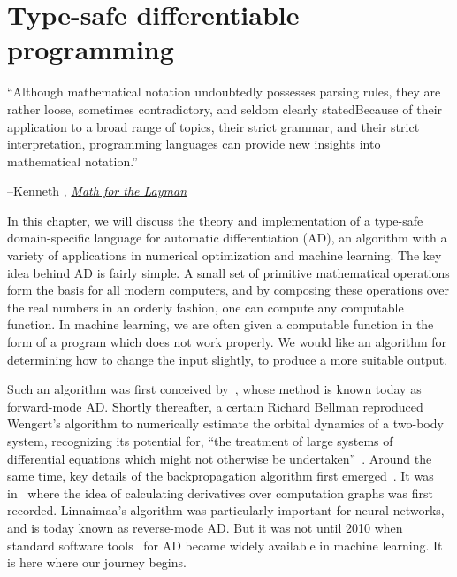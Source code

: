 \chapter{Type-safe differentiable programming}\label{ch:kotlingrad}

\setlength{\epigraphwidth}{0.86\textwidth}
\epigraph{``Although mathematical notation undoubtedly possesses parsing rules, they are rather loose, sometimes contradictory, and seldom clearly stated\textellipsis Because of their application to a broad range of topics, their strict grammar, and their strict interpretation, programming languages can provide new insights into mathematical notation.''}{\begin{flushright}--Kenneth \citet{iverson1999math}, \href{https://www.cs.trinity.edu/About/The_Courses/cs301/math-for-the-layman/}{\textit{Math for the Layman}}\end{flushright}}

In this chapter, we will discuss the theory and implementation of a type-safe domain-specific language for automatic differentiation (AD), an algorithm with a variety of applications in numerical optimization and machine learning. The key idea behind AD is fairly simple. A small set of primitive mathematical operations form the basis for all modern computers, and by composing these operations over the real numbers in an orderly fashion, one can compute any computable function. In machine learning, we are often given a computable function in the form of a program which does not work properly. We would like an algorithm for determining how to change the input slightly, to produce a more suitable output.

Such an algorithm was first conceived by~\citet{wengert1964simple}, whose method is known today as forward-mode AD. Shortly thereafter, a certain Richard Bellman reproduced Wengert's algorithm to numerically estimate the orbital dynamics of a two-body system, recognizing its potential for, ``the treatment of large systems of differential equations which might not otherwise be undertaken''~\citep{bellman1965wengert}. Around the same time, key details of the backpropagation algorithm first emerged~\citep{dreyfus1990artificial}. It was in~\citet{linnainmaa1970representation} where the idea of calculating derivatives over computation graphs was first recorded. Linnaimaa's algorithm was particularly important for neural networks, and is today known as reverse-mode AD. But it was not until 2010 when standard software tools~\citep{bergstra2010theano} for AD became widely available in machine learning. It is here where our journey begins.

